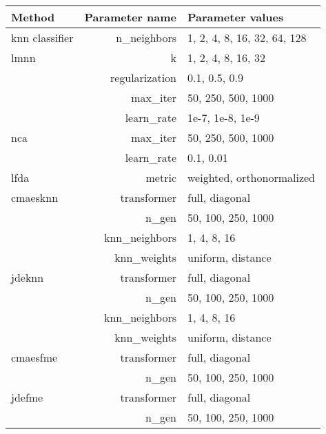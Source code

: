 \begin{table}[ht] \centering
\begin{tabular}{lrl}
\hline
Method & Parameter name & Parameter values \\
\hline

\ac{knn} classifier
    & n\_neighbors & 1, 2, 4, 8, 16, 32, 64, 128  \\

\ac{lmnn}
    & k & 1, 2, 4, 8, 16, 32  \\
    & regularization & 0.1, 0.5, 0.9  \\
    & max\_iter & 50, 250, 500, 1000  \\
    & learn\_rate & 1e-7, 1e-8, 1e-9  \\

\ac{nca}
    & max\_iter & 50, 250, 500, 1000  \\
    & learn\_rate & 0.1, 0.01  \\

\ac{lfda}
    & metric & weighted, orthonormalized  \\

\ac{cmaesknn}
    & transformer & full, diagonal  \\
    & n\_gen & 50, 100, 250, 1000  \\
    & knn\_neighbors & 1, 4, 8, 16  \\
    & knn\_weights & uniform, distance  \\

\ac{jdeknn}
    & transformer & full, diagonal  \\
    & n\_gen & 50, 100, 250, 1000  \\
    & knn\_neighbors & 1, 4, 8, 16  \\
    & knn\_weights & uniform, distance  \\

\ac{cmaesfme}
    & transformer & full, diagonal  \\
    & n\_gen & 50, 100, 250, 1000  \\

\ac{jdefme}
    & transformer & full, diagonal  \\
    & n\_gen & 50, 100, 250, 1000  \\



\end{tabular}
\end{table}
